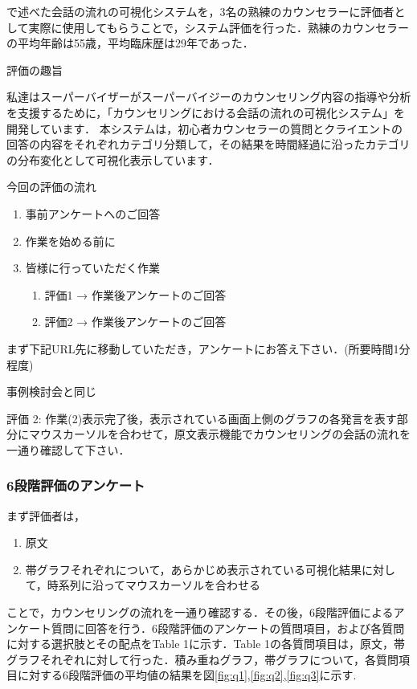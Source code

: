 \documentclass[shuuron]{kuee}
\begin{document}
で述べた会話の流れの可視化システムを，3名の熟練のカウンセラーに評価者として実際に使用してもらうことで，システム評価を行った．熟練のカウンセラーの平均年齢は55歳，平均臨床歴は29年であった．

評価の趣旨

私達はスーパーバイザーがスーパーバイジーのカウンセリング内容の指導や分析を支援するために，「カウンセリングにおける会話の流れの可視化システム」を開発しています．
本システムは，初心者カウンセラーの質問とクライエントの回答の内容をそれぞれカテゴリ分類して，その結果を時間経過に沿ったカテゴリの分布変化として可視化表示しています．

今回の評価の流れ







\begin{enumerate}

  \item 事前アンケートへのご回答
  \item 作業を始める前に
  \item 皆様に行っていただく作業
  \begin{enumerate}
    \item 評価1 → 作業後アンケートのご回答
    \item 評価2 → 作業後アンケートのご回答
  \end{enumerate}
\end{enumerate}


まず下記URL先に移動していただき，アンケートにお答え下さい．(所要時間1分程度)


事例検討会と同じ

評価 2: 作業(2)表示完了後，表示されている画面上側のグラフの各発言を表す部分にマウスカーソルを合わせて，原文表示機能でカウンセリングの会話の流れを一通り確認して下さい．

\subsubsection{6段階評価のアンケート}

まず評価者は，
\begin{enumerate}

  \item 原文
  \item 帯グラフそれぞれについて，あらかじめ表示されている可視化結果に対して，時系列に沿ってマウスカーソルを合わせる
\end{enumerate}


ことで，カウンセリングの流れを一通り確認する．その後，6段階評価によるアンケート質問に回答を行う．6段階評価のアンケートの質問項目，および各質問に対する選択肢とその配点をTable 1に示す．Table 1の各質問項目は，原文，帯グラフそれぞれに対して行った．積み重ねグラフ，帯グラフについて，各質問項目に対する6段階評価の平均値の結果を図\ref{fig:q1},\ref{fig:q2},\ref{fig:q3}に示す.
\end{document}

